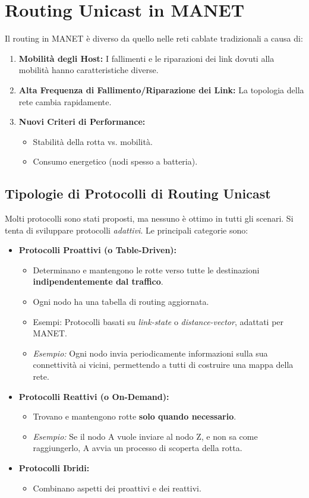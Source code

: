\documentclass{article}
\begin{document}
\section{Routing Unicast in MANET}
Il routing in MANET è diverso da quello nelle reti cablate tradizionali a causa di:
\begin{enumerate}
    \item \textbf{Mobilità degli Host:} I fallimenti e le riparazioni dei link dovuti alla mobilità hanno caratteristiche diverse.
    \item \textbf{Alta Frequenza di Fallimento/Riparazione dei Link:} La topologia della rete cambia rapidamente.
    \item \textbf{Nuovi Criteri di Performance:}
    \begin{itemize}
        \item Stabilità della rotta vs. mobilità.
        \item Consumo energetico (nodi spesso a batteria).
    \end{itemize}
\end{enumerate}

\subsection{Tipologie di Protocolli di Routing Unicast}
Molti protocolli sono stati proposti, ma nessuno è ottimo in tutti gli scenari. Si tenta di sviluppare protocolli \textit{adattivi}.
Le principali categorie sono:
\begin{itemize}
    \item \textbf{Protocolli Proattivi (o Table-Driven):}
    \begin{itemize}
        \item Determinano e mantengono le rotte verso tutte le destinazioni \textbf{indipendentemente dal traffico}.
        \item Ogni nodo ha una tabella di routing aggiornata.
        \item Esempi: Protocolli basati su \textit{link-state} o \textit{distance-vector}, adattati per MANET.
        \item \textit{Esempio:} Ogni nodo invia periodicamente informazioni sulla sua connettività ai vicini, permettendo a tutti di costruire una mappa della rete.
    \end{itemize}
    \item \textbf{Protocolli Reattivi (o On-Demand):}
    \begin{itemize}
        \item Trovano e mantengono rotte \textbf{solo quando necessario}.
        \item \textit{Esempio:} Se il nodo A vuole inviare al nodo Z, e non sa come raggiungerlo, A avvia un processo di scoperta della rotta.
    \end{itemize}
    \item \textbf{Protocolli Ibridi:}
    \begin{itemize}
        \item Combinano aspetti dei proattivi e dei reattivi.
    \end{itemize}
\end{itemize}
\end{document}
